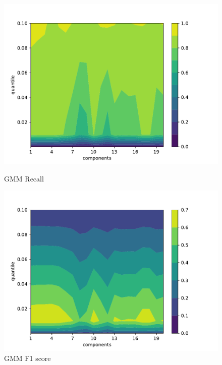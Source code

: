 \begin{figure}[H]
    \begin{minipage}[t]{0.5\textwidth}
        \vspace{0pt}
        \includegraphics[width=\textwidth]{images/gmm-recall.pdf}
        \caption{GMM Recall}
    \end{minipage}
    \hfill
    \begin{minipage}[t]{0.5\textwidth}
        \vspace{0pt}
        \includegraphics[width=\textwidth]{images/gmm-f1.pdf}
        \caption{GMM F1 score}
    \end{minipage}
\end{figure}

\noindent
  

